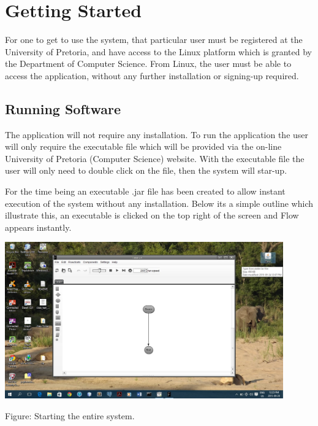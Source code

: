 \documentclass[11pt,a4paper,titlepage]{article}
\begin{document}
\section{Getting Started}
	
	For one to get to use the system, that particular user must be registered at the University of Pretoria, and have access to the Linux platform which is granted by the Department of Computer Science. From Linux, the user must be able to access the application, without any further installation or signing-up required.





	
	\subsection{Running Software}
	
	
		The application will not require any installation. To run the application the user will only require the executable file which will be provided via the on-line University of Pretoria (Computer Science) website. With the executable file the user will only need to double click on the file, then the system will star-up.
		
		For the time being an executable .jar file has been created to allow instant execution of the system without any installation. Below its a simple outline which illustrate this, an executable is clicked on the top right of the screen and Flow appears instantly. \newline \newline
		
		\includegraphics[width=12cm]{RunningFlow.jpg}
			\begin{center}
		Figure: Starting the entire system.\newline
		\end{center} 
		
\end{document}
